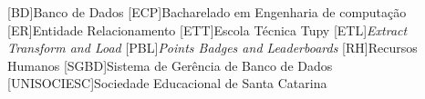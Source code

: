 
[BD]{Banco de Dados}
[ECP]{Bacharelado em Engenharia de computação}
[ER]{Entidade Relacionamento}
[ETT]{Escola Técnica Tupy}
[ETL]{\emph{Extract Transform and Load}}
[PBL]{\emph{Points Badges and Leaderboards}}
[RH]{Recursos Humanos}
[SGBD]{Sistema de Gerência de Banco de Dados}
[UNISOCIESC]{Sociedade Educacional de Santa Catarina}


